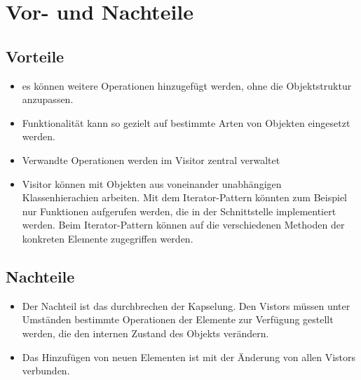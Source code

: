 \section{Vor-  und Nachteile}

\subsection{Vorteile}
\begin{itemize}


\item es können weitere Operationen hinzugefügt werden, ohne die Objektstruktur anzupassen.
\item Funktionalität kann so gezielt auf bestimmte Arten von Objekten eingesetzt werden.
\item Verwandte Operationen werden im Visitor zentral verwaltet
\item Visitor können mit Objekten aus voneinander unabhängigen Klassenhierachien arbeiten. Mit dem Iterator-Pattern könnten zum Beispiel nur Funktionen aufgerufen werden, die in der Schnittstelle implementiert werden. Beim Iterator-Pattern können auf die verschiedenen Methoden der konkreten Elemente zugegriffen werden.
\end{itemize}
\subsection{Nachteile}
\begin{itemize}

\item Der Nachteil ist das durchbrechen der Kapselung. Den Vistors müssen unter Umständen bestimmte Operationen der Elemente zur Verfügung gestellt werden, die den internen Zustand des Objekts verändern.
\item Das Hinzufügen von neuen Elementen ist mit der Änderung von allen Vistors verbunden.
\end{itemize}